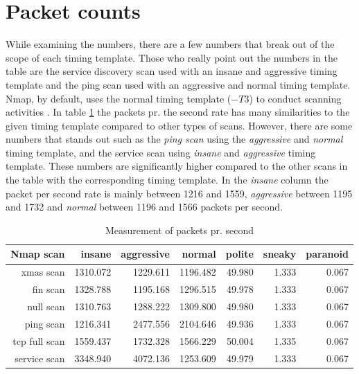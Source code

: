\section{Packet counts}
\label{s:PacketCounts}

While examining the numbers, there are a few numbers that break out of the scope of each timing template.
Those who really point out the numbers in the table are the service discovery scan used with an insane and aggressive timing template and the ping scan used with an aggressive and normal timing template.
Nmap, by default, uses the normal timing template ($-T3$) to conduct scanning activities \autocite{10.5555/1538595}.
In table \ref{tbl:PacketPrSecond} the packets pr. the second rate has many similarities to the given timing template compared to other types of scans.
However, there are some numbers that stands out such as the \textit{ping scan} using the \textit{aggressive} and \textit{normal} timing template, and the service scan using \textit{insane} and \textit{aggressive} timing template. These numbers are significantly higher compared to the other scans in the table with the corresponding timing template. 
In the \textit{insane} column the packet per second rate is mainly between 1216 and 1559, \textit{aggressive} between 1195 and 1732 and \textit{normal} between 1196 and 1566 packets per second.



\begin{table}[htbp]
\caption{Measurement of packets pr. second}
\begin{center}
\begin{tabular}{|r|r|r|r|r|r|r|}
\hline
\textbf{Nmap scan}&\textbf{insane}&\textbf{aggressive}&\textbf{normal}&\textbf{polite}&\textbf{sneaky}&\textbf{paranoid}\\
\hline
xmas scan&1310.072&1229.611&1196.482&49.980&1.333&0.067\\
\hline
fin scan&1328.788&1195.168&1296.515&49.978&1.333&0.067\\
\hline
null scan&1310.763&1288.222&1309.800&49.980&1.333&0.067\\
\hline
ping scan&1216.341&2477.556&2104.646&49.936&1.333&0.067\\
\hline
tcp full scan&1559.437&1732.328&1566.229&50.004&1.335&0.067\\
\hline
service scan&3348.940&4072.136&1253.609&49.979&1.333&0.067\\
\hline
\end{tabular}
\label{tbl:PacketPrSecond}
\end{center}
\end{table}

